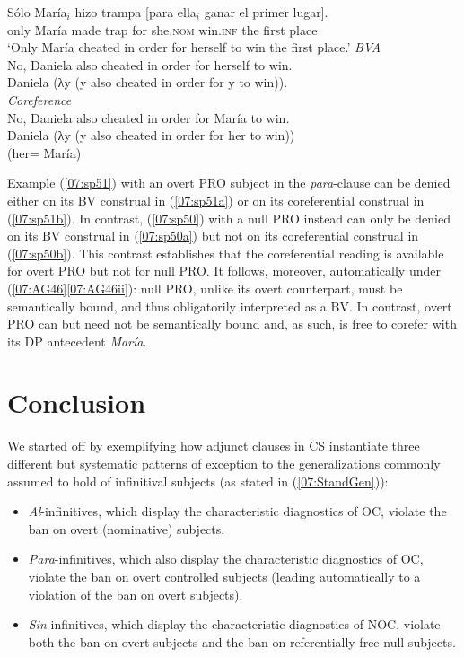 \documentclass[output=paper,colorlinks,citecolor=brown,draft,draftmode]{langscibook}
\begin{document}
\begin{exe}
\ex\label{07:sp51}
\gll Sólo María$_i$ hizo trampa [para ella$_i$ ganar el primer lugar].\\
only María made trap for she.\textsc{nom} win.\textsc{inf} the first place\\
\glt ‘Only María cheated in order for herself to win the first place.’
\ea\label{07:sp51a}\cmark\textit{BVA}\\
No, Daniela also cheated in order for herself to win. \\
  Daniela (λy (y also cheated in order for y to win)).\\
\ex\label{07:sp51b}\cmark\textit{Coreference}\\
No, Daniela also cheated in order for María to win.\\
 Daniela (λy (y also cheated in order for her to win))\\
(her= María)\\
\z
\end{exe}
Example (\ref{07:sp51}) with an overt PRO subject in the \textit{para}-clause can be denied either on its BV construal in (\ref{07:sp51a}) or on its coreferential construal in (\ref{07:sp51b}). In contrast, (\ref{07:sp50}) with a null PRO instead can only be denied on its BV construal in (\ref{07:sp50a}) but not on its coreferential construal in (\ref{07:sp50b}). This contrast establishes that the coreferential reading is available for overt PRO but not for null PRO. It follows, moreover, automatically under (\ref{07:AG46}\ref{07:AG46ii}): null PRO, unlike its overt counterpart, must be semantically bound, and thus obligatorily interpreted as a BV. In contrast, overt PRO can but need not be semantically bound and, as such, is free to corefer with its DP antecedent \textit{María}.

\section{Conclusion}
\label{07:sectionConclusion}
We started off by exemplifying how adjunct clauses in CS instantiate three different but systematic patterns of exception to the generalizations commonly assumed to hold of infinitival subjects (as stated in (\ref{07:StandGen})):
\begin{itemize}
    \item
    \textit{Al}-infinitives, which display the characteristic diagnostics of OC, violate the ban on overt (nominative) subjects.
    \item \textit{Para}-infinitives, which also display the characteristic diagnostics of OC, violate the ban on overt controlled subjects (leading automatically to a violation of the ban on overt subjects).
    \item
    \textit{Sin}-infinitives, which display the characteristic diagnostics of NOC, violate both the ban on overt subjects and the ban on referentially free null subjects.
 \end{itemize}
\end{document}
